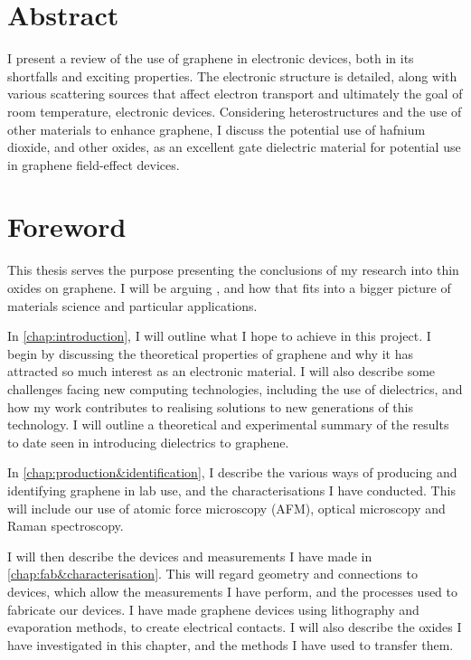 \documentclass{report}
\begin{document}
	
	\newcommand{\chapterNoNum}[1]{
		\chapter*{#1}
		\addcontentsline{toc}{chapter}{#1}
	}
	
	\chapterNoNum{Abstract}
	I present a review of the use of graphene in electronic devices, both in its shortfalls and exciting properties. The electronic structure is detailed, along with various scattering sources that affect electron transport and ultimately the goal of room temperature, electronic devices. Considering heterostructures and the use of other materials to enhance graphene, I discuss the potential use of hafnium dioxide, and other oxides, as an excellent gate dielectric material for potential use in graphene field-effect devices.
		
	\renewcommand{\baselinestretch}{0.94}\normalsize
	\tableofcontents
	\renewcommand{\baselinestretch}{1}\normalsize
	
	\chapterNoNum{Foreword}
	This thesis serves the purpose presenting the conclusions of my research into thin oxides on graphene. I will be arguing {}, and how that fits into a bigger picture of materials science and particular applications. %
	
	In \cref{chap:introduction}, I will outline what I hope to achieve in this project. I begin by discussing the theoretical properties of graphene and why it has attracted so much interest as an electronic material. I will also describe some challenges facing new computing technologies, including the use of dielectrics, and how my work contributes to realising solutions to new generations of this technology. I will outline a theoretical and experimental summary of the results to date seen in introducing dielectrics to graphene.
	
	In \cref{chap:production&identification}, I describe the various ways of producing and identifying graphene in lab use, and the characterisations I have conducted. This will include our use of atomic force microscopy (AFM), optical microscopy and Raman spectroscopy.
	
	I will then describe the devices and measurements I have made in \cref{chap:fab&characterisation}. This will regard geometry and connections to devices, which allow the measurements I have perform, and the processes used to fabricate our devices. I have made graphene devices using lithography and evaporation methods, to create electrical contacts. I will also describe the oxides I have investigated in this chapter, and the methods I have used to transfer them.
	
\end{document}
